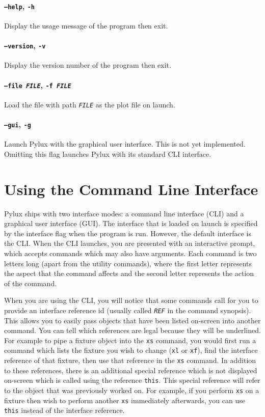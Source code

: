 \documentclass[a4paper]{article}
\begin{document}
\paragraph{\texttt{--help}, \texttt{-h}}
Display the usage message of the program then exit.

\paragraph{\texttt{--version}, \texttt{-v}}
Display the version number of the program then exit.

\paragraph{\texttt{--file \textit{FILE}}, \texttt{-f \textit{FILE}}} 
Load the file with path \texttt{\textit{FILE}} as the plot file on launch.

\paragraph{\texttt{--gui}, \texttt{-g}}
Launch Pylux with the graphical user interface. This is not yet implemented. 
Omitting this flag launches Pylux with its standard CLI interface.


\section{Using the Command Line Interface}
Pylux ships with two interface modes: a command line interface (CLI) and a 
graphical user interface (GUI). The interface that is loaded on launch is 
specified by the interface flag when the program is run. However, the 
default interface is the CLI. When the CLI launches, you are presented with an 
interactive prompt, which accepts commands which may also have arguments. Each 
command is two letters long (apart from the utility commands), where the first 
letter represents the aspect that the command affects and the second letter 
represents the action of the command.

When you are using the CLI, you will notice that some commands call for you 
to provide an interface reference id (usually called \texttt{\textit{REF}} 
in the command synopsis). This allows you to easily pass objects that have 
been listed on-screen into another command. You can tell which references are 
legal because they will be underlined. For example to pipe a fixture object 
into the \texttt{xs} command, you would first run a command which lists the 
fixture you wish to change (\texttt{xl} or \texttt{xf}), find the interface 
reference of that fixture, then use that reference in the \texttt{xs} 
command. In addition to these references, there is an additional special 
reference which is not displayed on-screen which is called using the 
reference \texttt{this}. This special reference will refer to the object that 
was previously worked on. For example, if you perform \texttt{xs} on a fixture 
then wish to perform another \texttt{xs} immediately afterwards, you can use 
\texttt{this} instead of the interface reference.
\end{document}
